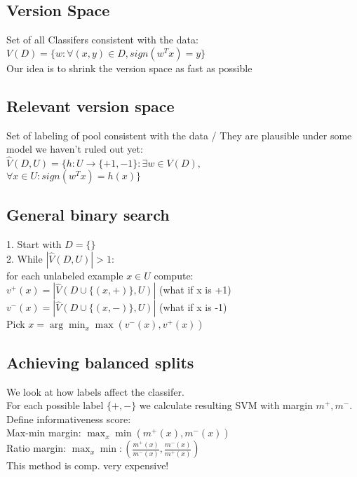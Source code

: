 \subsection*{Version Space}
Set of all Classifers consistent with the data:\\
$V(D) = \{w: \forall (x,y) \in D, sign(w^T x) = y\}$\\
Our idea is to shrink the version space as fast as possible

\subsection*{Relevant version space}
Set of labeling of pool consistent with the data / They are plausible under some model we haven't ruled out yet:\\
$\hat{V}(D,U) = \{h:U \rightarrow \{+1,-1\} : \exists w \in V(D),$\\
$\forall x \in U: sign(w^T x) = h(x) \}$

\subsection*{General binary search}
1. Start with $D=\{\}$\\
2. While $|\hat{V}(D,U)| > 1$:\\
for each unlabeled example $x \in U$ compute:\\
$v^+(x) = |\hat{V}(D \cup \{(x,+)\}, U)|$ (what if x is +1)\\
$v^-(x) = |\hat{V}(D \cup \{(x,-)\}, U)|$ (what if x is -1)\\
Pick $x = \arg \min_x \max(v^-(x), v^+(x))$

\subsection*{Achieving balanced splits}
We look at how labels affect the classifer.\\
For each possible label $\{+,-\}$ we calculate resulting SVM with margin $m^+, m^-$.\\
Define informativeness score:\\
Max-min margin: $\max_x \min (m^+(x), m^-(x))$\\
Ratio margin: $\max_x \min: \left ( \frac{m^+(x)}{m^-(x)}, \frac{m^-(x)}{m^+(x)} \right )$\\
This method is comp. very expensive!

